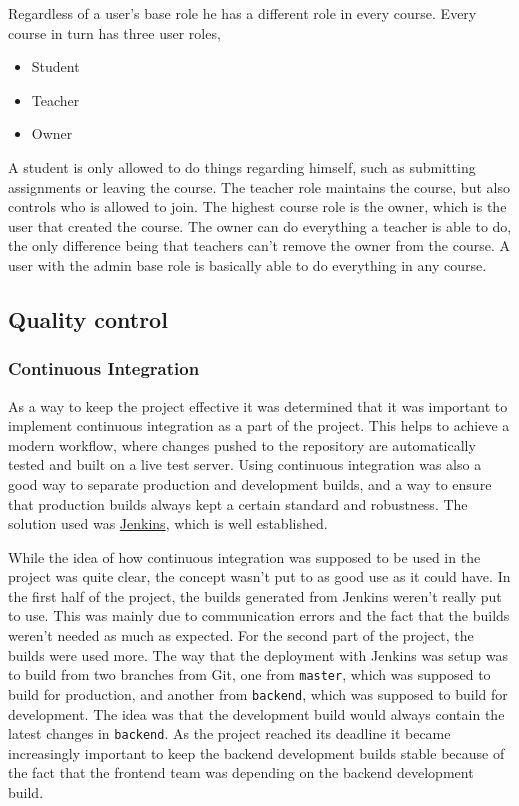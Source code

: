 Regardless of a user's base role he has a different role in every course. Every course in turn has three user roles,
\begin{itemize}
\item Student
\item Teacher
\item Owner
\end{itemize}
A student is only allowed to do things regarding himself, such as submitting assignments or leaving the course. The teacher role maintains the course, but also controls who is allowed to join. The highest course role is the owner, which is the user that created the course. The owner can do everything a teacher is able to do, the only difference being that teachers can't remove the owner from the course. A user with the admin base role is basically able to do everything in any course.

\subsection{Quality control}
\subsubsection{Continuous Integration}
As a way to keep the project effective it was determined that it was important to implement continuous integration as a part of the project. This helps to achieve a modern workflow, where changes pushed to the repository are automatically tested and built on a live test server. Using continuous integration was also a good way to separate production and development builds, and a way to ensure that production builds always kept a certain standard and robustness. The solution used was \href{https://jenkins-ci.org/}{Jenkins}, which is well established.

While the idea of how continuous integration was supposed to be used in the project was quite clear, the concept wasn't put to as good use as it could have. In the first half of the project, the builds generated from Jenkins weren't really put to use. This was mainly due to communication errors and the fact that the builds weren't needed as much as expected. For the second part of the project, the builds were used more. The way that the deployment with Jenkins was setup was to build from two branches from Git, one from \texttt{master}, which was supposed to build for production, and another from \texttt{backend}, which was supposed to build for development. The idea was that the development build would always contain the latest changes in \texttt{backend}. As the project reached its deadline it became increasingly important to keep the backend development builds stable because of the fact that the frontend team was depending on the backend development build.

